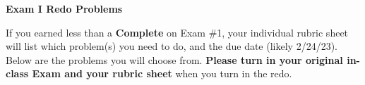 \documentclass{article}[10 pt]
\newcommand{\vs}{\vspace{0.1in}}
\begin{document}
\thispagestyle{empty}

 \hspace{1in}

\vspace{.15in}

{\centerline{\bf Exam I Redo Problems  }}

\vspace{.2in}


 If you earned less than a \textbf{Complete} on Exam \#1, your individual rubric sheet will list which problem(s) you need to do, and the due date (likely 2/24/23). Below are the problems you will choose from. \textbf{Please turn in your original in-class Exam and your rubric sheet} when you turn in the redo.



\vs

\vs
\end{document}

